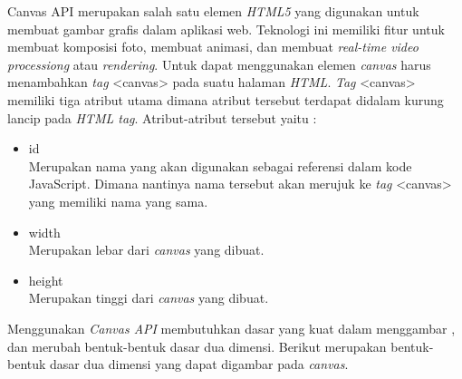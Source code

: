 Canvas API merupakan salah satu elemen \textit{HTML5} yang digunakan untuk membuat gambar grafis dalam aplikasi web. Teknologi ini memiliki fitur untuk membuat komposisi foto, membuat animasi, dan membuat \textit{real-time video processiong} atau \textit{rendering}. Untuk dapat menggunakan elemen \textit{canvas} harus menambahkan \textit{tag} <canvas> pada suatu halaman \textit{HTML}. \textit{Tag} <canvas> memiliki tiga atribut utama dimana atribut tersebut terdapat didalam kurung lancip pada \textit{HTML tag}. Atribut-atribut tersebut yaitu : 

\begin{itemize}
	\item id \\
	Merupakan nama yang akan digunakan sebagai referensi dalam kode JavaScript. Dimana nantinya nama tersebut akan merujuk ke \textit{tag} <canvas> yang memiliki nama yang sama.
	\item width \\
	Merupakan lebar dari \textit{canvas} yang dibuat.
	\item height \\
	Merupakan tinggi dari \textit{canvas} yang dibuat.
\end{itemize}

Menggunakan \textit{Canvas API} membutuhkan dasar yang kuat dalam menggambar , dan merubah bentuk-bentuk dasar dua dimensi. Berikut merupakan bentuk-bentuk dasar dua dimensi yang dapat digambar pada \textit{canvas}.

